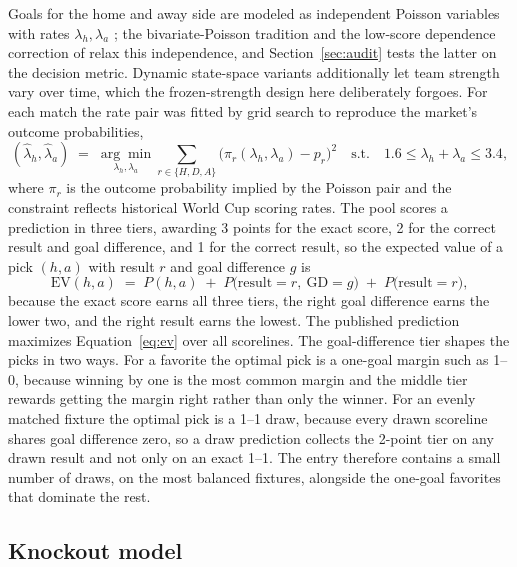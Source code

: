 \documentclass[11pt,a4paper]{article}
\begin{document}
Goals for the home and away side are modeled as independent Poisson variables with rates $\lambda_h, \lambda_a$ \citep{maher1982}; the bivariate-Poisson tradition \citep{karlis2003} and the low-score dependence correction of \citet{dixoncoles1997} relax this independence, and Section~\ref{sec:audit} tests the latter on the decision metric. Dynamic state-space variants \citep{koopmanlit2015} additionally let team strength vary over time, which the frozen-strength design here deliberately forgoes. For each match the rate pair was fitted by grid search to reproduce the market's outcome probabilities,
\begin{equation}
(\hat\lambda_h, \hat\lambda_a) \;=\; \underset{\lambda_h,\lambda_a}{\arg\min} \sum_{r \in \{H,D,A\}} \bigl(\pi_r(\lambda_h,\lambda_a) - p_r\bigr)^2
\quad \text{s.t.} \quad 1.6 \le \lambda_h + \lambda_a \le 3.4,
\end{equation}
where $\pi_r$ is the outcome probability implied by the Poisson pair and the constraint reflects historical World Cup scoring rates. The pool scores a prediction in three tiers, awarding 3 points for the exact score, 2 for the correct result and goal difference, and 1 for the correct result, so the expected value of a pick $(h,a)$ with result $r$ and goal difference $g$ is
\begin{equation}
\mathrm{EV}(h,a) \;=\; P(h,a) \;+\; P\bigl(\text{result}=r,\ \text{GD}=g\bigr) \;+\; P\bigl(\text{result}=r\bigr),
\label{eq:ev}
\end{equation}
because the exact score earns all three tiers, the right goal difference earns the lower two, and the right result earns the lowest. The published prediction maximizes Equation~\eqref{eq:ev} over all scorelines. The goal-difference tier shapes the picks in two ways. For a favorite the optimal pick is a one-goal margin such as 1--0, because winning by one is the most common margin and the middle tier rewards getting the margin right rather than only the winner. For an evenly matched fixture the optimal pick is a 1--1 draw, because every drawn scoreline shares goal difference zero, so a draw prediction collects the 2-point tier on any drawn result and not only on an exact 1--1. The entry therefore contains a small number of draws, on the most balanced fixtures, alongside the one-goal favorites that dominate the rest.

\subsection{Knockout model}\label{sec:elo}
\end{document}
